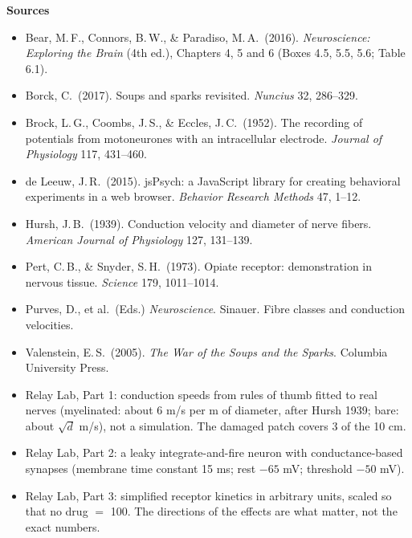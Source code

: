 \documentclass[12pt,a4paper]{article}
\newcommand{\pagehead}[1]{{\color{kprimary}\LARGE\bfseries #1}\par\vspace{2pt}{\color{kaccent}\rule{\linewidth}{1.2pt}}\par\vspace{4pt}}
\begin{document}
\newpage
\pagehead{Sources}
\small
\begin{itemize}[leftmargin=1.2em,itemsep=2pt]
\item Bear, M.\,F., Connors, B.\,W., \& Paradiso, M.\,A.\ (2016). \emph{Neuroscience: Exploring the Brain} (4th ed.), Chapters 4, 5 and 6 (Boxes 4.5, 5.5, 5.6; Table 6.1).
\item Borck, C.\ (2017). Soups and sparks revisited. \emph{Nuncius} 32, 286--329.
\item Brock, L.\,G., Coombs, J.\,S., \& Eccles, J.\,C.\ (1952). The recording of potentials from motoneurones with an intracellular electrode. \emph{Journal of Physiology} 117, 431--460.
\item de Leeuw, J.\,R.\ (2015). jsPsych: a JavaScript library for creating behavioral experiments in a web browser. \emph{Behavior Research Methods} 47, 1--12.
\item Hursh, J.\,B.\ (1939). Conduction velocity and diameter of nerve fibers. \emph{American Journal of Physiology} 127, 131--139.
\item Pert, C.\,B., \& Snyder, S.\,H.\ (1973). Opiate receptor: demonstration in nervous tissue. \emph{Science} 179, 1011--1014.
\item Purves, D., et al.\ (Eds.) \emph{Neuroscience}. Sinauer. Fibre classes and conduction velocities.
\item Valenstein, E.\,S.\ (2005). \emph{The War of the Soups and the Sparks}. Columbia University Press.
\item Relay Lab, Part 1: conduction speeds from rules of thumb fitted to real nerves (myelinated: about 6 m/s per \textmu m of diameter, after Hursh 1939; bare: about $\sqrt{d}$ m/s), not a simulation. The damaged patch covers 3 of the 10 cm.
\item Relay Lab, Part 2: a leaky integrate-and-fire neuron with conductance-based synapses (membrane time constant 15 ms; rest $-65$ mV; threshold $-50$ mV).
\item Relay Lab, Part 3: simplified receptor kinetics in arbitrary units, scaled so that no drug $=$ 100. The directions of the effects are what matter, not the exact numbers.
\end{itemize}
\end{document}
